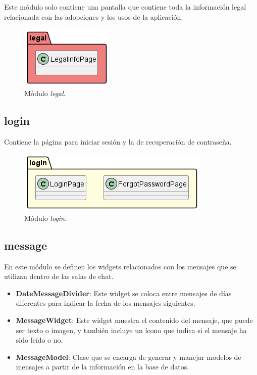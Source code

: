 \documentclass[a4paper, 12pt]{article}
\begin{document}
Este módulo solo contiene una pantalla que contiene toda la información legal relacionada con las adopciones y los usos de la aplicación.

\begin{figure}[H]
	\begin{center}
		{\includegraphics[]{diagram/Legal.png}\par}
		\caption{Módulo  \textit{legal}.}
	\end{center}
\end{figure}


\subsection*{login}


Contiene la página para iniciar sesión y la de recuperación de contraseña.

\begin{figure}[H]
	\begin{center}
		{\includegraphics[width=0.8\linewidth]{diagram/Login.png}\par}
		\caption{Módulo  \textit{login}.}
	\end{center}
\end{figure}


\subsection*{message}

En este módulo se definen los widgets relacionados con los mensajes que se utilizan dentro de las salas de chat.

\begin{itemize}[noitemsep]
	\item \textbf{DateMessageDivider}: Este widget se coloca entre mensajes de días diferentes para indicar la fecha de los mensajes siguientes.
	\item \textbf{MessageWidget}: Este widget muestra el contenido del mensaje, que puede ser texto o imagen, y también incluye un ícono que indica si el mensaje ha sido leído o no.
	\item \textbf{MessageModel}: Clase que se encarga de generar y manejar modelos de mensajes a partir de la información en la base de datos.
\end{itemize}
\end{document}
